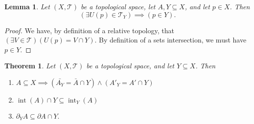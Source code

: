 \documentclass[10pt,a4paper]{article}
\theoremstyle{theorem}
\newtheorem{theorem}{Theorem}
\newtheorem{lemma}{Lemma}
\theoremstyle{definition}
\DeclareMathOperator{\interior}{int}
\newcommand{\Tau}{\mathcal{T}}
\begin{document}
\begin{lemma}
Let $(X, \Tau)$ be a topological space,  let $A,Y \subseteq X$, and let $p \in X$. Then 
\begin{equation}
(\exists U(p) \in \Tau_Y) \implies (p \in Y).
\end{equation}
\end{lemma}

\begin{proof}
We have, by definition of a relative topology, that $(\exists V \in \Tau)(U(p) = V \cap Y)$.  By definition of a sets intersection, we must have $p \in Y$.
\end{proof}
\begin{theorem}
Let $(X, \Tau)$ be a topological space, and let $Y \subseteq X$. Then 
\begin{enumerate}
\item $A \subseteq X \implies (\bar{A_Y} = \bar{A} \cap Y) \land (A'_Y = A' \cap Y)$
\item $\interior(A) \cap Y \subseteq \interior_Y (A)$
\item $\partial_Y A \subseteq \partial A \cap Y.$
\end{enumerate}
\end{theorem}
\end{document}
